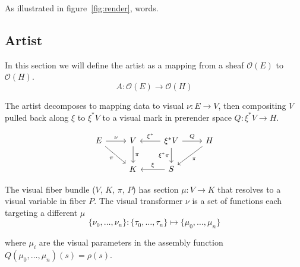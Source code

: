 \documentclass[../main.tex]{subfiles}
\begin{document}
As illustrated in figure~\ref{fig:render}, words.

\subsection{Artist}

In this section we will define the artist as a mapping from a sheaf $\mathcal{O}(E)$  to $\mathcal{O}(H)$. 
\begin{equation}
    A: \mathcal{O}(E) \rightarrow \mathcal{O}(H)
\end{equation}

The artist decomposes to mapping data to visual $\nu:E\rightarrow V$, then  compositing $V$ pulled back along $\xi$ to $\xi^*V$ to a visual mark in prerender space $Q:\xi^*V\rightarrow H$. 

\begin{equation}
    \label{eq:artist}
    \begin{tikzcd}
        E \arrow[r, "\nu"] \arrow[rd, "\pi"'] & V \arrow[d, "\pi"] & \xi^*V \arrow[r, "Q"] \arrow[d, "\xi^*\pi"'] \arrow[l, "\xi^*"'] & H \arrow[ld, "\pi"] \\
                                              & K                  & S \arrow[l, "\xi"']                                              &                    
        \end{tikzcd}
\end{equation}

The visual fiber bundle ($V$, $K$, $\pi$, $P$) has section $\mu: V \rightarrow K$ that resolves to a visual variable \cite{bertinIIPropertiesGraphic2011,munznerMarksChannels} in fiber $P$. The visual transformer $\nu$ is a set of functions each targeting a different $\mu$
\begin{equation}
    \label{eq:nu_expanded}
    \{\nu_{0}, \ldots, \nu_{n}\}: \{\tau_{0}, \ldots, \tau_{n}\} \mapsto \{\mu_{0}, \ldots, \mu_{n}\}
\end{equation}

where $\mu_{i}$ are the visual parameters in the assembly function $Q(\mu_{0}, \ldots, \mu_{n})(s) = \rho(s)$. 
\end{document}
